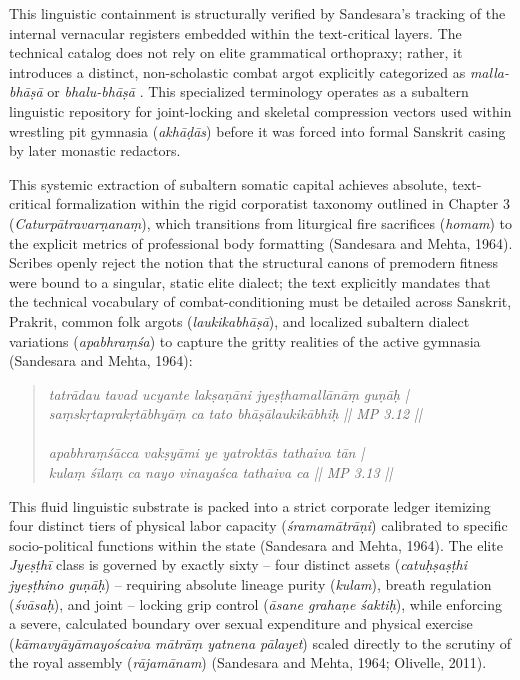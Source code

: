 \documentclass[11pt,twoside,letterpaper]{article}
\begin{document}
This linguistic containment is structurally verified by Sandesara’s tracking of the internal vernacular registers embedded within the text-critical layers. The technical catalog does not rely on elite grammatical orthopraxy; rather, it introduces a distinct, non-scholastic combat argot explicitly categorized as \textit{malla-bhāṣā} or \textit{bhalu-bhāṣā} \citep{Sandesara1948}. This specialized terminology operates as a subaltern linguistic repository for joint-locking and skeletal compression vectors used within wrestling pit gymnasia (\textit{akhāḍās}) before it was forced into formal Sanskrit casing by later monastic redactors.

This systemic extraction of subaltern somatic capital achieves absolute, text-critical formalization within the rigid corporatist taxonomy outlined in Chapter 3 (\textit{Caturpātravarṇanaṃ}), which transitions from liturgical fire sacrifices (\textit{homam}) to the explicit metrics of professional body formatting (Sandesara and Mehta, 1964). Scribes openly reject the notion that the structural canons of premodern fitness were bound to a singular, static elite dialect; the text explicitly mandates that the technical vocabulary of combat-conditioning must be detailed across Sanskrit, Prakrit, common folk argots (\textit{laukikabhāṣā}), and localized subaltern dialect variations (\textit{apabhraṃśa}) to capture the gritty realities of the active gymnasia (Sandesara and Mehta, 1964):

\begin{quote}
\small
\textit{tatrādau tavad ucyante lakṣaṇāni jyeṣṭhamallānāṃ guṇāḥ | \\
saṃskṛtaprakṛtābhyāṃ ca tato bhāṣālaukikābhiḥ || MP 3.12 || \\
\\
apabhraṃśācca vakṣyāmi ye yatroktās tathaiva tān | \\
kulaṃ śīlaṃ ca nayo vinayaśca tathaiva ca || MP 3.13 ||}
\end{quote}

This fluid linguistic substrate is packed into a strict corporate ledger itemizing four distinct tiers of physical labor capacity (\textit{śramamātrāṇi}) calibrated to specific socio-political functions within the state (Sandesara and Mehta, 1964). The elite \textit{Jyeṣṭhī} class is governed by exactly sixty -- four distinct assets (\textit{catuḥṣaṣṭhi jyeṣṭhino guṇāḥ}) -- requiring absolute lineage purity (\textit{kulam}), breath regulation (\textit{śvāsaḥ}), and joint -- locking grip control (\textit{āsane grahaṇe śaktiḥ}), while enforcing a severe, calculated boundary over sexual expenditure and physical exercise (\textit{kāmavyāyāmayoścaiva mātrāṃ yatnena pālayet}) scaled directly to the scrutiny of the royal assembly (\textit{rājamānam}) (Sandesara and Mehta, 1964; Olivelle, 2011).
\end{document}
